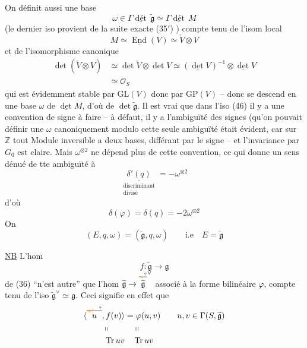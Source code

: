 On définit aussi une base
\[
\omega\in\Gamma\underline{\operatorname{\text{dét}}}\,\widetilde{\mathfrak g}\simeq\Gamma\underline{\operatorname{\text{dét}}}\,M\tag*{(46)}
\]
(le dernier iso provient de la suite exacte (35$'$) ) compte tenu de l'isom local
\[
M\simeq\underline{\operatorname{End}}(V)\simeq\check V\otimes V
\]
et de l'isomorphisme canonique
\[
\begin{aligned}
\det(\check V\otimes V)&\simeq\det\check V\otimes\det V\simeq(\underline{\det}V)^{-1}\otimes\underline{\det}V\\
&\simeq\mathcal O_S
\end{aligned}\tag*{(47)}
\]
qui est évidemment stable par $\mathrm{GL}(V)$ donc par $\mathrm{GP}(V)$ -- donc se descend en une base $\omega$ de $\underline{\det}M$, d'où de $\det\widetilde{\mathfrak g}$. Il est vrai que dans l'iso (46) il y a une convention de signe à faire -- à défaut, il y a l'ambiguïté des signes (qu'on pouvait définir une  $\omega$ canoniquement modulo cette seule ambiguïté était évident, car sur $\mathbb Z$ tout Module inversible a  deux bases, différant par le signe -- et l'invariance par  $G_0$ est claire. Mais $\omega^{\otimes2}$ ne dépend plus de cette convention, ce qui donne un sens dénué de tte ambiguïté à
\[
\underset{\substack{\text{discriminant}\\\text{divisé}}}{\underline{\delta'(q)}}=-\omega^{\otimes2}\tag*{(48)}
\]
d'où
\[
\delta(\varphi)=\delta(q)=-2\omega^{\otimes2}\tag*{(49)}
\]
On 
\[
(E,q,\omega)=(\widetilde{\mathfrak g},q,\omega)\qquad\text{i.e}\quad E=\widetilde{\mathfrak g}\tag*{(50)}
\]


\uline{NB} L'hom 
\[
f:\widetilde{\mathfrak g}\longrightarrow\mathfrak g\tag*{(51)}
\]
de (36) ``n'est autre'' que l'hom $\widetilde{\mathfrak g}\to\overset{\deleted{\unsure{\sim}}}{\widetilde{\mathfrak g}}^\vee$ associé à la forme bilinéaire $\varphi$, compte tenu de l'iso $\widetilde{\mathfrak g}^\vee\simeq\mathfrak g$. Ceci signifie en effet que
\[
\begin{aligned}
\langle\overset{\deleted{\unsure{w|-}}}{u},f(v)\rangle&=\varphi(u,v)\qquad u,v\in\Gamma(S,\widetilde{\mathfrak g})\\
\shortparallel\qquad&\quad\shortparallel\\
\operatorname{Tr}uv&\quad\operatorname{Tr}uv
\end{aligned}
\]

